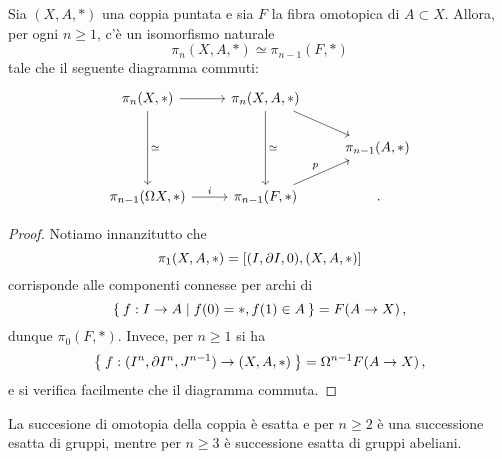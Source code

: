 \begin{lemma}\label{lemma-htpfib}
	Sia $(X, A,\ast)$ una coppia puntata e sia $F$ la fibra
	omotopica di $A \subset X$.
	Allora, per ogni $n \ge 1$, c'è un isomorfismo naturale
	\begin{equation*}
		\pi_{n}(X,A,\ast) \simeq \pi_{n-1}(F,\ast)
	\end{equation*}
	tale che il seguente diagramma commuti:
	\begin{equation*}
		\begin{tikzcd}
			\pi_{n}(X,\ast) \ar[r] \ar[dd, "\simeq"]
			& \pi_{n}(X,A,\ast) \ar[dd, "\simeq"] \ar[dr] & \\
			& & \pi_{n-1}(A, \ast) \\
			\pi_{n-1}(\Omega X, \ast) \ar[r, "i"]
			& \pi_{n-1}(F,\ast) \ar[ur, "p"] & \,.
		\end{tikzcd}
	\end{equation*}
	\begin{proof}%
		Notiamo innanzitutto che
		\begin{equation*}
			\pi_{1}(X,A,\ast) = [(I, \partial I, 0), (X,A,\ast)]
		\end{equation*}
		corrisponde alle componenti connesse per archi di
		\begin{equation*}
			\Set{f:I \to A| f(0) = \ast, f(1) \in A} = F(A \to X)\,,
		\end{equation*}
		dunque $\pi_{0}(F, \ast)$. Invece, per $n \ge 1$ si ha
		\begin{equation*}
			\Set{f:(I^{n}, \partial I^{n}, J^{n-1}) \to (X,A,\ast)}
			= \Omega^{n-1} F(A \to X)\,,
		\end{equation*}
		e si verifica facilmente che il diagramma commuta.
	\end{proof}
\end{lemma}

\begin{cor}
	La succesione di omotopia della coppia è esatta
	e per $n \ge 2$ è una successione esatta di gruppi,
	mentre per $n \ge 3$ è successione esatta di gruppi abeliani.
\end{cor}

